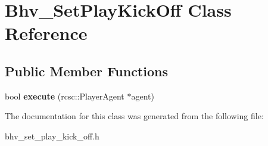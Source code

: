 \hypertarget{classBhv__SetPlayKickOff}{
\section{Bhv\_\-SetPlayKickOff Class Reference}
\label{classBhv__SetPlayKickOff}
}
\subsection*{Public Member Functions}
\begin{DoxyCompactItemize}
\item 
\hypertarget{classBhv__SetPlayKickOff_afeba910f4011ebd032ddef6a38d88208}{
bool {\bfseries execute} (rcsc::PlayerAgent $\ast$agent)}
\label{classBhv__SetPlayKickOff_afeba910f4011ebd032ddef6a38d88208}

\end{DoxyCompactItemize}


The documentation for this class was generated from the following file:\begin{DoxyCompactItemize}
\item 
bhv\_\-set\_\-play\_\-kick\_\-off.h\end{DoxyCompactItemize}
